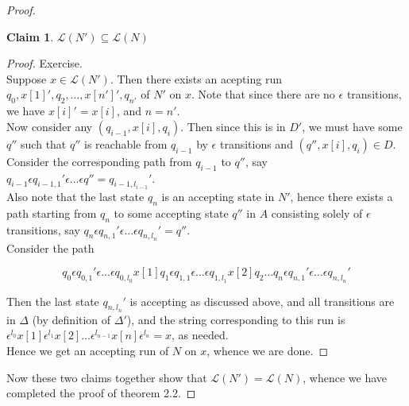\documentclass[a4paper]{article}
\newtheorem{claim}{Claim}
\newcommand{\mc}{\mathcal}
\begin{document}
\begin{proof}
    \begin{claim}
        $\mc{L}(N') \subseteq \mc{L}(N)$
    \end{claim}

    \begin{proof}
        Exercise.\\

        Suppose $x \in \mc{L}(N')$. Then there exists an acepting run $q_0, x[1]', q_2, \ldots, x[n']', q_{n'}$ of $N'$ on $x$. Note that since there are no $\epsilon$ transitions, we have $x[i]'
        = x[i]$, and $n = n'$.\\

        Now consider any $(q_{i - 1}, x[i], q_i)$. Then since this is in $D'$, we must have some $q''$ such that $q''$ is reachable from $q_{i - 1}$ by $\epsilon$ transitions and $(q'', x[i], q_i) \in
        D$.\\
        
        Consider the corresponding path from $q_{i - 1}$ to $q''$, say $q_{i - 1} \epsilon q_{i - 1, 1}' \epsilon \ldots \epsilon q'' = q_{i - 1, l_{i - 1}}'$.\\

        Also note that the last state $q_n$ is an accepting state in $N'$, hence there exists a path starting from $q_n$ to some accepting state $q''$ in $A$ consisting solely of $\epsilon$
        transitions, say $q_n \epsilon q_{n, 1}' \epsilon \ldots \epsilon q_{n, l_n}' = q''$.\\

        Consider the path

        $$q_0 \epsilon q_{0, 1}' \epsilon \ldots \epsilon q_{0, l_0} x[1] q_1 \epsilon q_{1, 1} \epsilon \ldots \epsilon q_{1, l_1} x[2] q_2 \ldots q_n \epsilon q_{n, 1}' \epsilon \ldots \epsilon
        q_{n, l_n}'$$

        Then the last state $q_{n, l_n}'$ is accepting as discussed above, and all transitions are in $\Delta$ (by definition of $\Delta'$), and the string corresponding to this run is
        $\epsilon^{l_0} x[1] \epsilon^{l_1} x[2] \ldots \epsilon^{l_{n-1}} x[n] \epsilon^{l_n} = x$, as needed.\\
        
        Hence we get an accepting run of $N$ on $x$, whence we are done.

    \end{proof}

    Now these two claims together show that $\mc{L}(N') = \mc{L}(N)$, whence we have completed the proof of theorem 2.2.
\end{proof}
\end{document}
